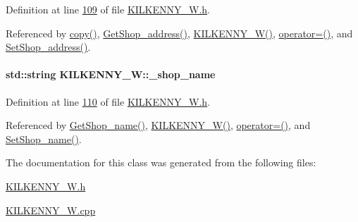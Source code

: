 Definition at line \hyperlink{_k_i_l_k_e_n_n_y___w_8h_source_l00109}{109} of file \hyperlink{_k_i_l_k_e_n_n_y___w_8h_source}{K\+I\+L\+K\+E\+N\+N\+Y\+\_\+\+W.\+h}.



Referenced by \hyperlink{_k_i_l_k_e_n_n_y___w_8cpp_source_l00035}{copy()}, \hyperlink{_k_i_l_k_e_n_n_y___w_8cpp_source_l00129}{Get\+Shop\+\_\+address()}, \hyperlink{_k_i_l_k_e_n_n_y___w_8h_source_l00024}{K\+I\+L\+K\+E\+N\+N\+Y\+\_\+\+W()}, \hyperlink{_k_i_l_k_e_n_n_y___w_8h_source_l00075}{operator=()}, and \hyperlink{_k_i_l_k_e_n_n_y___w_8cpp_source_l00125}{Set\+Shop\+\_\+address()}.

\paragraph[{\texorpdfstring{\+\_\+shop\+\_\+name}{_shop_name}}]{\setlength{\rightskip}{0pt plus 5cm}std\+::string K\+I\+L\+K\+E\+N\+N\+Y\+\_\+\+W\+::\+\_\+shop\+\_\+name\hspace{0.3cm}{\ttfamily [private]}}\hypertarget{class_k_i_l_k_e_n_n_y___w_a3ca31fe82131bef3b13759e6d8b9a83b_a3ca31fe82131bef3b13759e6d8b9a83b}{}\label{class_k_i_l_k_e_n_n_y___w_a3ca31fe82131bef3b13759e6d8b9a83b_a3ca31fe82131bef3b13759e6d8b9a83b}


Definition at line \hyperlink{_k_i_l_k_e_n_n_y___w_8h_source_l00110}{110} of file \hyperlink{_k_i_l_k_e_n_n_y___w_8h_source}{K\+I\+L\+K\+E\+N\+N\+Y\+\_\+\+W.\+h}.



Referenced by \hyperlink{_k_i_l_k_e_n_n_y___w_8cpp_source_l00121}{Get\+Shop\+\_\+name()}, \hyperlink{_k_i_l_k_e_n_n_y___w_8h_source_l00024}{K\+I\+L\+K\+E\+N\+N\+Y\+\_\+\+W()}, \hyperlink{_k_i_l_k_e_n_n_y___w_8h_source_l00075}{operator=()}, and \hyperlink{_k_i_l_k_e_n_n_y___w_8cpp_source_l00117}{Set\+Shop\+\_\+name()}.



The documentation for this class was generated from the following files\+:\begin{DoxyCompactItemize}
\item 
\hyperlink{_k_i_l_k_e_n_n_y___w_8h}{K\+I\+L\+K\+E\+N\+N\+Y\+\_\+\+W.\+h}\item 
\hyperlink{_k_i_l_k_e_n_n_y___w_8cpp}{K\+I\+L\+K\+E\+N\+N\+Y\+\_\+\+W.\+cpp}\end{DoxyCompactItemize}
